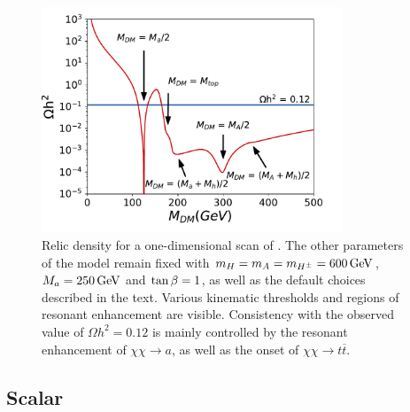 \begin{figure}[h]
\centering
\includegraphics[width=0.8\textwidth]{texinputs/05_relic/figures/relic/line_scan_mdm.pdf}
\caption{Relic density for a one-dimensional scan of \mDM. The other parameters of the model remain fixed with $m_{H}=m_{A}=m_{H^{\pm}}=\unit[600]{GeV}$, $\ma=\unit[250]{GeV}$ and $\tan\beta=1$, as well as the default choices described in the text. Various kinematic thresholds and regions of resonant enhancement are visible. Consistency with the observed value of $\Omega h^{2} = 0.12$ is mainly controlled by the resonant enhancement of $\chi\chi\rightarrow a$, as well as the onset of $\chi\chi\rightarrow t\overline{t}$.}
\label{fig:relic_scan_mxd}
\end{figure}

\subsection{Scalar}

